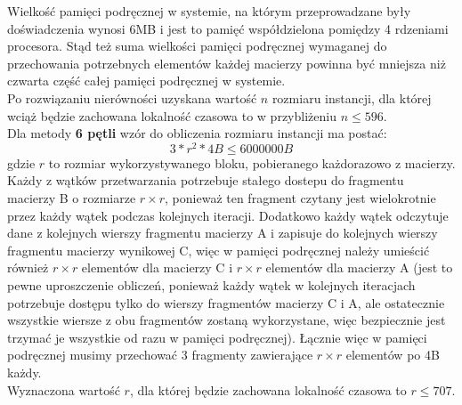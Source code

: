 \documentclass[10pt,a4paper]{article}
\begin{document}
Wielkość pamięci podręcznej w systemie, na którym przeprowadzane były doświadczenia wynosi 6MB i
jest to pamięć współdzielona pomiędzy 4 rdzeniami procesora. Stąd też suma wielkości pamięci podręcznej
wymaganej do przechowania potrzebnych elementów każdej macierzy powinna być mniejsza niż czwarta
część całej pamięci podręcznej w systemie.\\
Po rozwiązaniu nierówności uzyskana wartość $n$ rozmiaru instancji, dla której wciąż będzie zachowana
lokalność czasowa to w przybliżeniu $n \leq 596$.\\

Dla metody \textbf{6 pętli} wzór do obliczenia rozmiaru instancji ma postać:
\begin{equation}
	3*r^2 * 4B \leq 6000000B
\end{equation}
gdzie $r$ to rozmiar wykorzystywanego bloku, pobieranego każdorazowo z macierzy.\\

Każdy z wątków przetwarzania potrzebuje stałego dostepu do fragmentu macierzy B o rozmiarze $r \times r$, ponieważ
ten fragment czytany jest wielokrotnie przez każdy wątek podczas kolejnych iteracji. Dodatkowo każdy wątek odczytuje
dane z kolejnych wierszy fragmentu macierzy A i zapisuje do kolejnych wierszy fragmentu macierzy wynikowej C,
więc w pamięci podręcznej należy umieścić również $r \times r$ elementów dla macierzy C i $r \times r$ elementów
dla macierzy A (jest to pewne uproszczenie obliczeń, ponieważ każdy wątek w kolejnych iteracjach potrzebuje
dostępu tylko do wierszy fragmentów macierzy C i A, ale ostatecznie wszystkie wiersze z obu fragmentów zostaną
wykorzystane, więc bezpiecznie jest trzymać je wszystkie od razu w pamięci podręcznej). Łącznie więc w pamięci
podręcznej musimy przechować 3 fragmenty zawierające $r \times r$ elementów po 4B każdy.\\

Wyznaczona wartość $r$, dla której będzie zachowana lokalność czasowa to $r \leq 707$.

\newpage
\end{document}
